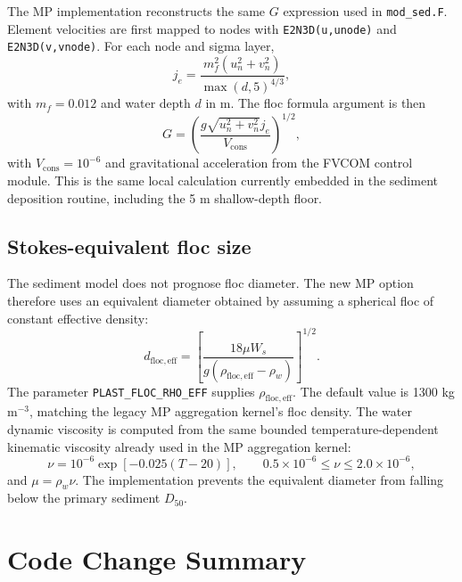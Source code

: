 \documentclass[11pt]{article}
\begin{document}
The MP implementation reconstructs the same $G$ expression used in
\texttt{mod\_sed.F}.  Element velocities are first mapped to nodes with
\texttt{E2N3D(u,unode)} and \texttt{E2N3D(v,vnode)}.  For each node and sigma
layer,
\begin{equation}
  j_e = \frac{m_f^2 (u_n^2 + v_n^2)}
             {\max(d,5)^{4/3}},
\end{equation}
with $m_f = 0.012$ and water depth $d$ in m.  The floc formula argument is then
\begin{equation}
  G =
  \left(
  \frac{g \sqrt{u_n^2+v_n^2} j_e}{V_{\mathrm{cons}}}
  \right)^{1/2},
\end{equation}
with $V_{\mathrm{cons}} = 10^{-6}$ and gravitational acceleration from the
FVCOM control module.  This is the same local calculation currently embedded in
the sediment deposition routine, including the 5 m shallow-depth floor.

\subsection*{Stokes-equivalent floc size}

The sediment model does not prognose floc diameter.  The new MP option therefore
uses an equivalent diameter obtained by assuming a spherical floc of constant
effective density:
\begin{equation}
  d_{\mathrm{floc,eff}} =
  \left[
  \frac{18 \mu W_s}
       {g(\rho_{\mathrm{floc,eff}}-\rho_w)}
  \right]^{1/2}.
\end{equation}
The parameter \texttt{PLAST\_FLOC\_RHO\_EFF} supplies
$\rho_{\mathrm{floc,eff}}$.  The default value is 1300 kg m$^{-3}$, matching the
legacy MP aggregation kernel's floc density.  The water dynamic viscosity is
computed from the same bounded temperature-dependent kinematic viscosity already
used in the MP aggregation kernel:
\begin{equation}
  \nu = 10^{-6} \exp[-0.025(T-20)],
  \qquad 0.5\times10^{-6} \le \nu \le 2.0\times10^{-6},
\end{equation}
and $\mu = \rho_w \nu$.  The implementation prevents the equivalent diameter
from falling below the primary sediment $D_{50}$.

\section*{Code Change Summary}
\end{document}
